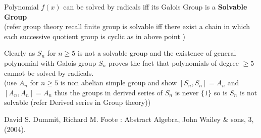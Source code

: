 \documentclass[11pt]{extarticle}
\newcommand{\snote}[1]{{\footnotesize(#1)}}
\newcommand{\tbx}[2][]{
\begin{tcolorbox}[enhanced,breakable,size=small,colback=black!2!white,title={#1},arc is angular, arc=1.5mm,drop fuzzy shadow]
	#2
\end{tcolorbox}
}
\begin{document}
\begin{multicols}{2}
\tbx[Solvablity theorem ]{  Polynomial $ f(x) $ can be solved by radicals iff its Galois Group is a \textbf{Solvable Group} \\
\snote{refer group theory recall finite group is solvable iff there exist a chain in which each successive quotient group is cyclic as in above point }}
\tbx[Insovablity of quintic and higher degree polynomial]{ Clearly as $ S_n $ for $ n\geq 5 $ is not a solvable group and the existence of general polynomial with Galois group $ S_n $ proves the fact that polynomials of degree $ \geq 5 $ cannot be solved by radicals.\\
\snote{use $ A_n $ for $ n\geq 5 $ is non abelian simple group and show $ [S_n,S_n]=A_n $ and $ [A_n,A_n] =A_n$ thus the groups in derived series of $ S_n $ is never $ \{1\} $ so is $ S_n $ is not solvable (refer Derived series in Group theory)} }

\begin{thebibliography}{9}
 	David S. Dummit, Richard M. Foote : Abstract Algebra, John Wailey \& sons, 3, (2004).
\end{thebibliography}
	
	\end{multicols}
	
\end{document}
